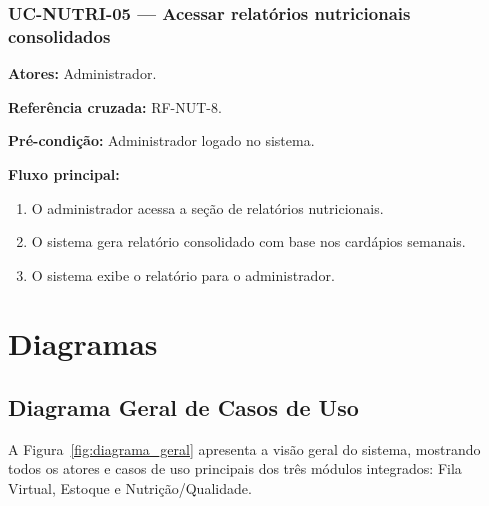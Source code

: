 \documentclass[12pt,a4paper]{article}
\begin{document}
\subsubsection{UC-NUTRI-05 — Acessar relatórios nutricionais consolidados}
\textbf{Atores:} Administrador.  

\textbf{Referência cruzada:} RF-NUT-8.  

\textbf{Pré-condição:} Administrador logado no sistema.  

\textbf{Fluxo principal:}
\begin{enumerate}
    \item O administrador acessa a seção de relatórios nutricionais.
    \item O sistema gera relatório consolidado com base nos cardápios semanais.
    \item O sistema exibe o relatório para o administrador.
\end{enumerate}


\section{Diagramas}

\subsection{Diagrama Geral de Casos de Uso}

A Figura~\ref{fig:diagrama_geral} apresenta a visão geral do sistema, mostrando todos os atores e casos de uso principais dos três módulos integrados: Fila Virtual, Estoque e Nutrição/Qualidade.
\end{document}
